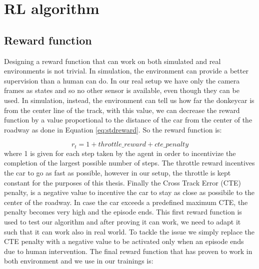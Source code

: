 \begin{center}
    \begin{minipage}{0.9\linewidth}
      
      \end{minipage}
    \begin{minipage}{0.9\linewidth}
      
      \end{minipage}
\end{center}

\section{RL algorithm}

\subsection{Reward function}
Designing a reward function that can work on both simulated and real environments is not trivial. In simulation, the environment can provide a better supervision than a human can do. In our real setup we have only the camera frames as states and so no other sensor is available, even though they can be used. In simulation, instead, the environment can tell us how far the donkeycar is from the center line of the track, with this value, we can decrease the reward function by a value proportional to the distance of the car from the center of the roadway as done in Equation \ref{eq:stdreward}. So the reward function is:

\begin{equation}
  \label{eq:stdreward}
  r_t = 1 + throttle\_reward + cte\_penalty
\end{equation}
where 1 is given for each step taken by the agent in order to incentivize the completion of the largest possible number of steps. The throttle reward incentives the car to go as fast as possible, however in our setup, the throttle is kept constant for the purposes of this thesis. Finally the Cross Track Error (CTE) penalty, is a negative value to incentive the car to stay as close as possibile to the center of the roadway. In case the car exceeds a predefined maximum CTE, the penalty becomes very high and the episode ends. 
This first reward function is used to test our algorithm and after proving it can work, we need to adapt it such that it can work also in real world. To tackle the issue we simply replace the CTE penalty with a negative value to be activated only when an episode ends due to human intervention. The final reward function that has proven to work in both environment and we use in our trainings is:


